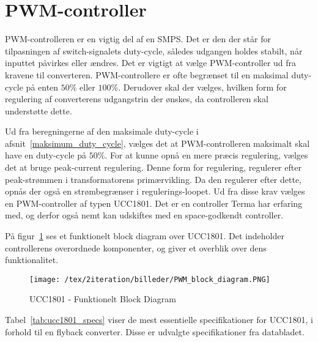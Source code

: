 
\section{PWM-controller} \label{PWM}
PWM-controlleren er en vigtig del af en SMPS. Det er den der står for tilpasningen af switch-signalets duty-cycle, således udgangen holdes stabilt, når inputtet påvirkes eller ændres. Det er vigtigt at vælge PWM-controller ud fra kravene til converteren. PWM-controllere er ofte begrænset til en maksimal duty-cycle på enten $50\percent$ eller $100\percent$. Derudover skal der vælges, hvilken form for regulering af converterens udgangstrin der ønskes, da controlleren skal understøtte dette. 

Ud fra beregningerne af den maksimale duty-cycle i afsnit~\ref{maksimum_duty_cycle}, vælges det at PWM-controlleren maksimalt skal have en duty-cycle på $50\percent$. For at kunne opnå en mere præcis regulering, vælges det at bruge peak-current regulering. Denne form for regulering, regulerer efter peak-strømmen i transformatorens primærvikling. Da den regulerer efter dette, opnås der også en strømbegrænser i regulerings-loopet. Ud fra disse krav vælges en PWM-controller af typen UCC1801\cite{UCC1801}. Det er en controller Terma har erfaring med, og derfor også nemt kan udskiftes med en space-godkendt controller.

På figur~\ref{fig:PWM_block_diagram} ses et funktionelt block diagram over UCC1801. Det indeholder controllerens overordnede komponenter, og giver et overblik over dens funktionalitet. 

\begin{figure}[H]
	\center
	\texttt{[image: /tex/2iteration/billeder/PWM\_block\_diagram.PNG]}
	\caption{UCC1801 - Funktionelt Block Diagram}
	\label{fig:PWM_block_diagram}
\end{figure}

Tabel~\ref{tab:ucc1801_specs} viser de mest essentielle specifikationer for UCC1801, i forhold til en flyback converter. Disse er udvalgte specifikationer fra databladet.

